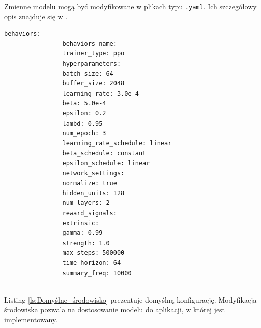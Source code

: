 \documentclass[a4paper,twoside,12pt]{book}
\begin{document}
		Zmienne modelu mogą być modyfikowane w plikach typu \texttt{.yaml}. Ich szczegółowy opis znajduje się w \cite{bib:parametry_yaml}.
			
			\begin{lstlisting}[caption={Domyślny format pliku .yaml .}, label={ls:Domyślne_środowisko}]
				behaviors:
				behaviors_name: 
				trainer_type: ppo
				hyperparameters:
				batch_size: 64
				buffer_size: 2048
				learning_rate: 3.0e-4
				beta: 5.0e-4
				epsilon: 0.2
				lambd: 0.95
				num_epoch: 3
				learning_rate_schedule: linear
				beta_schedule: constant
				epsilon_schedule: linear
				network_settings:
				normalize: true
				hidden_units: 128
				num_layers: 2
				reward_signals:
				extrinsic:
				gamma: 0.99
				strength: 1.0
				max_steps: 500000
				time_horizon: 64
				summary_freq: 10000
				
			\end{lstlisting}
		Listing \ref{ls:Domyślne_środowisko} prezentuje domyślną konfigurację. Modyfikacja środowiska pozwala na dostosowanie modelu do aplikacji, w której jest implementowany.
		
\end{document}
